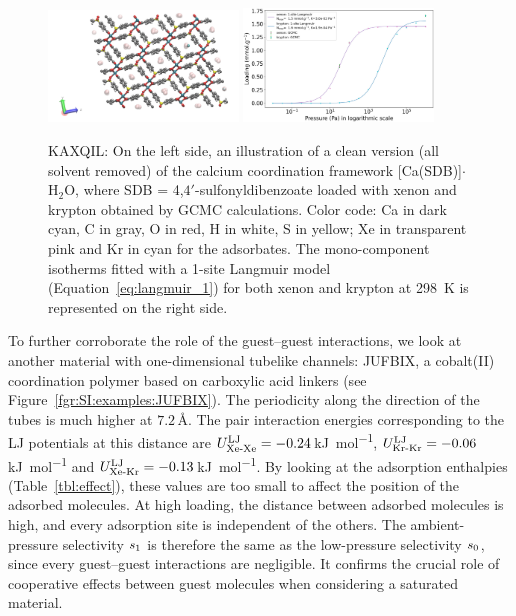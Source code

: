 \documentclass[main.tex]{subfiles}
\begin{document}
\begin{figure}[h]
  \centering
    \includegraphics[width=0.45\textwidth]{figures/2-thermo/KAXQIL_clean.jpg}
    \includegraphics[width=0.45\textwidth]{figures/2-thermo/KAXQIL_clean_isotherm_xenon_krypton_298K.jpg}
    \caption{KAXQIL: On the left side, an illustration of a clean version (all solvent removed) of the calcium coordination framework [Ca(SDB)]$\cdot$H$_2$O, where SDB = 4,$4'$-sulfonyldibenzoate loaded with xenon and krypton obtained by GCMC calculations. Color code: Ca in dark cyan, C in gray, O in red, H in white, S in yellow; Xe in transparent pink and Kr in cyan for the adsorbates. The mono-component isotherms fitted with a 1-site Langmuir model (Equation~\ref{eq:langmuir_1}) for both xenon and krypton at \SI{298}{\kelvin} is represented on the right side.}\label{fgr:SI:examples:KAXQIL}
  \end{figure}

To further corroborate the role of the guest--guest interactions, we look at another material with one-dimensional tubelike channels: JUFBIX, a cobalt(II) coordination polymer based on carboxylic acid linkers (see Figure~\ref{fgr:SI:examples:JUFBIX}).\autocite{JUFBIX} The periodicity along the direction of the tubes is much higher at $7.2$\,\si{\angstrom}. The pair interaction energies corresponding to the LJ potentials at this distance are $U^{\text{LJ}}_{\text{Xe-Xe}}=-0.24$\,\si{\kilo\joule\per\mol}, $U^{\text{LJ}}_{\text{Kr-Kr}}=-0.06$\,\si{\kilo\joule\per\mol} and $U^{\text{LJ}}_{\text{Xe-Kr}}=-0.13$\,\si{\kilo\joule\per\mol}. By looking at the adsorption enthalpies (Table~\ref{tbl:effect}), these values are too small to affect the position of the adsorbed molecules. At high loading, the distance between adsorbed molecules is high, and every adsorption site is independent of the others. The ambient-pressure selectivity $s_{\text{1}}$ is therefore the same as the low-pressure selectivity $s_{\text{0}}$, since every guest--guest interactions are negligible. It confirms the crucial role of cooperative effects between guest molecules when considering a saturated material.
\end{document}
